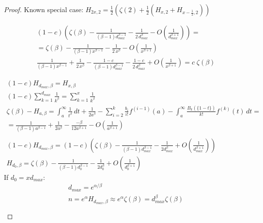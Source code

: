 \begin{proof}
    Known special case:
    $H_{2x,2}=\frac{1}{2}\left(\zeta(2)+\frac{1}{2}\left(H_{x,2}+H_{x-\frac{1}{2},2}\right)\right)$
    
    \begin{gather*}
        (1-c)\left(\zeta(\beta)-\frac{1}{(\beta-1)d_{max}^{\beta-1}}-\frac{1}{2\,d_{max}^\beta}-O\left(\frac{1}{d_{max}^{\beta+1}}\right)\right)=\\
        =\zeta(\beta)-\frac{1}{(\beta-1)x^{\beta-1}}-\frac{1}{2\,x^\beta}-O\left(\frac{1}{x^{\beta+1}}\right)\\
        \frac{1}{(\beta-1)x^{\beta-1}}+\frac{1}{2\,x^\beta}-\frac{1-c}{(\beta-1)d_{max}^{\beta-1}}-\frac{1-c}{2\,d_{max}^\beta}+O\left(\frac{1}{x^{\beta+1}}\right)=c\;\zeta(\beta)
    \end{gather*}
    
    \begin{gather*}
        (1-c)H_{d_{max},\beta}=H_{x,\beta}\\
        (1-c)\sum_{k=1}^{d_{max}}\frac{1}{k^\beta}=\sum_{k=1}^{x}\frac{1}{k^\beta}\\
        \zeta(\beta)-H_{a,\beta}=\int_a^\infty{\frac{1}{t^\beta}\,dt}
        +\frac{1}{2a^\beta}
        -\sum_{i=2}^k{\frac{b_i}{i!}f^{(i-1)}(a)}
        -\int_a^\infty{\frac{B_k(\{1-t\})}{k!}f^{(k)}(t)\,dt}=\\
        =\frac{1}{(\beta-1)a^{\beta-1}}
        +\frac{1}{2a^\beta}
        -\frac{-\beta}{12a^{\beta+1}}
        -O\left(\frac{1}{a^{\beta+1}}\right)\\\\
        (1-c)H_{d_{max},\beta}=(1-c)\left(\zeta(\beta)-\frac{1}{(\beta-1)d_{max}^{\beta-1}}
        -\frac{1}{2d_{max}^\beta}
        +O\left(\frac{1}{d_{max}^{\beta+1}}\right)\right)\\
        H_{d_0,\beta}=\zeta(\beta)-\frac{1}{(\beta-1)d_0^{\beta-1}}
        -\frac{1}{2d_0^\beta}
        +O\left(\frac{1}{d_0^{\beta+1}}\right)
    \end{gather*}
    If $d_0=xd_{max}$:
    \begin{gather*}
        d_{max}=e^{\alpha/\beta}\\
        n=e^\alpha H_{d_{max},\beta}\approx e^\alpha\zeta(\beta)
        =d_{max}^\beta\zeta(\beta)\\\\

\end{gather*}
\end{proof}
